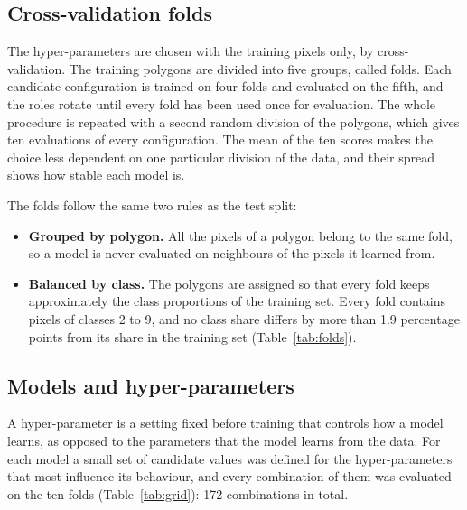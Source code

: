 \documentclass[11pt,a4paper]{article}
\begin{document}
\subsection{Cross-validation folds}

The hyper-parameters are chosen with the training pixels only, by
cross-validation. The training polygons are divided into five groups, called
folds. Each candidate configuration is trained on four folds and evaluated on
the fifth, and the roles rotate until every fold has been used once for
evaluation. The whole procedure is repeated with a second random division of
the polygons, which gives ten evaluations of every configuration. The mean of
the ten scores makes the choice less dependent on one particular division of
the data, and their spread shows how stable each model is.

The folds follow the same two rules as the test split:

\begin{itemize}
  \item \textbf{Grouped by polygon.} All the pixels of a polygon belong to the
  same fold, so a model is never evaluated on neighbours of the pixels it
  learned from.
  \item \textbf{Balanced by class.} The polygons are assigned so that every
  fold keeps approximately the class proportions of the training set. Every
  fold contains pixels of classes 2 to 9, and no class share differs by more
  than 1.9 percentage points from its share in the training set
  (Table~\ref{tab:folds}).
\end{itemize}

\begin{table}[H]
\centering\small
\caption{Share of each class in the training set and its range across the
ten validation folds.}
\label{tab:folds}

\end{table}

\subsection{Models and hyper-parameters}

A hyper-parameter is a setting fixed before training that controls how a model
learns, as opposed to the parameters that the model learns from the data. For
each model a small set of candidate values was defined for the
hyper-parameters that most influence its behaviour, and every combination of
them was evaluated on the ten folds (Table~\ref{tab:grid}): 172 combinations
in total.
\end{document}
